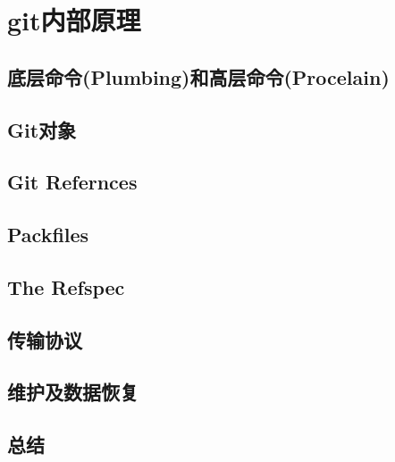 \documentclass{book}
\begin{document}
\chapter{git内部原理}
	\section{底层命令(Plumbing)和高层命令(Procelain)}
	\section{Git对象}
	\section{Git Refernces}
	\section{Packfiles}
	\section{The Refspec}
	\section{传输协议}
	\section{维护及数据恢复}
	\section{总结}
\end{document}
